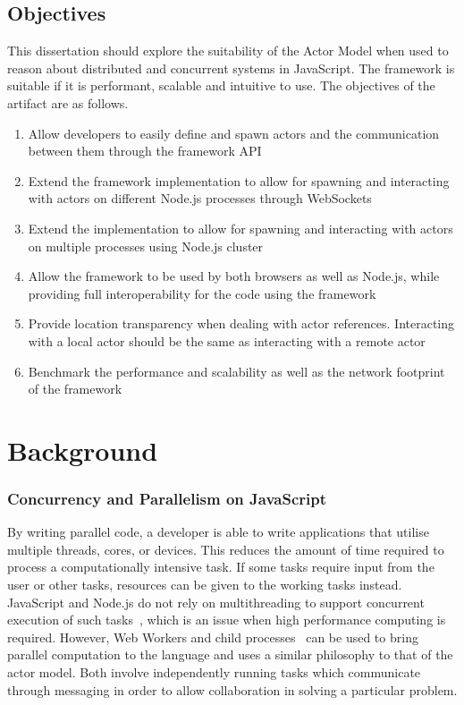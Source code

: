 \documentclass[12pt, a4paper]{report}
\theoremstyle{definition}
\theoremstyle{definition}%
\theoremstyle{definition}%
\theoremstyle{definition}%
\theoremstyle{definition}%
\theoremstyle{definition}%
\begin{document}
\section{Objectives}
This dissertation should explore the suitability of the Actor Model when used to reason about distributed and concurrent systems in JavaScript. The framework is suitable if it is performant, scalable and intuitive to use. The objectives of the artifact are as follows.
\begin{enumerate}
    \item Allow developers to easily define and spawn actors and the communication between them through the framework API
    \item Extend the framework implementation to allow for spawning and interacting with actors on different Node.js processes through WebSockets
    \item Extend the implementation to allow for spawning and interacting with actors on multiple processes using Node.js cluster
    \item Allow the framework to be used by both browsers as well as Node.js, while providing full interoperability for the code using the framework
    \item Provide location transparency when dealing with actor references. Interacting with a local actor should be the same as interacting with a remote actor
    \item Benchmark the performance and scalability as well as the network footprint of the framework
\end{enumerate}

\chapter{Background}
\subsection{Concurrency and Parallelism on JavaScript}
By writing parallel code, a developer is able to write applications that utilise multiple threads, cores, or devices. This reduces the amount of time required to process a computationally intensive task. If some tasks require input from the user or other tasks, resources can be given to the working tasks instead. JavaScript and Node.js do not rely on multithreading to support concurrent execution of such tasks~\cite{highperformance}, which is an issue when high performance computing is required. However, Web Workers and child processes~\cite{concurrencyjs}\cite{spidersjs} can be used to bring parallel computation to the language and uses a similar philosophy to that of the actor model. Both involve independently running tasks which communicate through messaging in order to allow collaboration in solving a particular problem.
\end{document}
